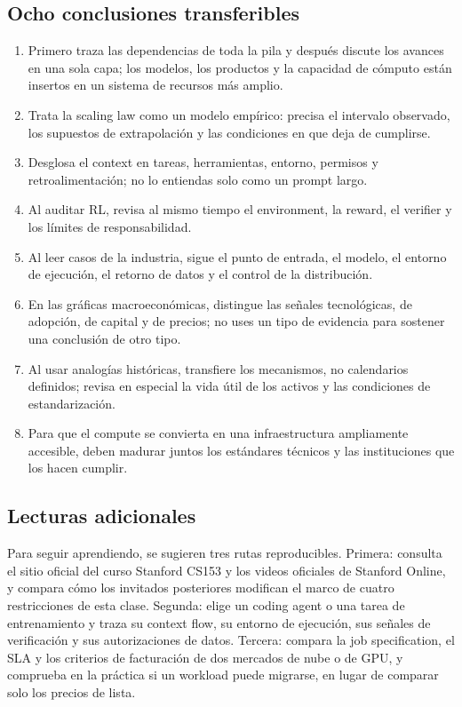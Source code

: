 \documentclass[a4paper]{article}
\begin{document}
\subsection{Ocho conclusiones transferibles}

\begin{enumerate}
  \item Primero traza las dependencias de toda la pila y después discute los avances en una sola capa; los modelos, los productos y la capacidad de cómputo están insertos en un sistema de recursos más amplio.
  \item Trata la scaling law como un modelo empírico: precisa el intervalo observado, los supuestos de extrapolación y las condiciones en que deja de cumplirse.
  \item Desglosa el context en tareas, herramientas, entorno, permisos y retroalimentación; no lo entiendas solo como un prompt largo.
  \item Al auditar RL, revisa al mismo tiempo el environment, la reward, el verifier y los límites de responsabilidad.
  \item Al leer casos de la industria, sigue el punto de entrada, el modelo, el entorno de ejecución, el retorno de datos y el control de la distribución.
  \item En las gráficas macroeconómicas, distingue las señales tecnológicas, de adopción, de capital y de precios; no uses un tipo de evidencia para sostener una conclusión de otro tipo.
  \item Al usar analogías históricas, transfiere los mecanismos, no calendarios definidos; revisa en especial la vida útil de los activos y las condiciones de estandarización.
  \item Para que el compute se convierta en una infraestructura ampliamente accesible, deben madurar juntos los estándares técnicos y las instituciones que los hacen cumplir.
\end{enumerate}

\subsection{Lecturas adicionales}

Para seguir aprendiendo, se sugieren tres rutas reproducibles. Primera: consulta el sitio oficial del curso Stanford CS153 y los videos oficiales de Stanford Online, y compara cómo los invitados posteriores modifican el marco de cuatro restricciones de esta clase. Segunda: elige un coding agent o una tarea de entrenamiento y traza su context flow, su entorno de ejecución, sus señales de verificación y sus autorizaciones de datos. Tercera: compara la job specification, el SLA y los criterios de facturación de dos mercados de nube o de GPU, y comprueba en la práctica si un workload puede migrarse, en lugar de comparar solo los precios de lista.
\end{document}
